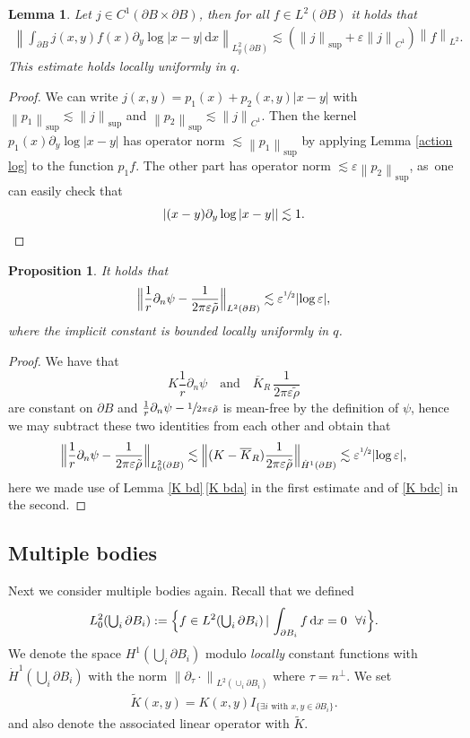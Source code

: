 \documentclass[JEP,XML,SOM,Unicode,published]{cedram}
\let\epsilon\varepsilon
\let\ts\textstyle
\newtheorem{proposition}[theorem]{Proposition}
\newtheorem{lemma}[theorem]{Lemma}
\theoremstyle{definition}
\newcommand\norm[1]{\left\lVert #1\right\rVert}
\newcommand\Bnorm[1]{\Bigl\lVert #1\Bigr\rVert}
\newcommand\eq{=}
\newcommand\dd{\,\mathrm{d}}
\newcommand\dx{\dd x}
\let\de\partial
\let\eps\epsilon
\begin{document}
\begin{lemma}\label{perturbed log}
Let $j\in C^1(\de B\times \de B)$, then for all $f\in L^2(\de B)$ it holds that
\begin{align*}
\norm{\int_{\de B} j(x,y)f(x)\de_y\log|x-y|\dx}_{L_y^2(\de B)}\lesssim \left(\norm{j}_{\sup}+\eps\norm{j}_{C^1}\right)\norm{f}_{L^2}.
\end{align*}
This estimate holds locally uniformly in $q$.
\end{lemma}
\begin{proof}
We can write $j(x,y)=p_1(x)+p_2(x,y)|x-y|$ with $\norm{p_1}_{\sup}\lesssim \norm{j}_{\sup}$ and $\norm{p_2}_{\sup}\lesssim \norm{j}_{C^1}$. Then the kernel $p_1(x)\de_y\log|x-y|$ has operator norm $\lesssim \norm{p_1}_{\sup}$ by applying Lemma \ref{action log} to the function $p_1f$. The other part has operator norm $\lesssim \eps\norm{p_2}_{\sup}$, as~one can easily check that
\[
|(x-y)\de_y\log|x-y||\lesssim 1.\qedhere
\]
\end{proof}

\begin{proposition}\label{est single body}
It holds that
\begin{align*}
\Bnorm{\frac{1}{r}\de_n\psi-\frac{1}{2\pi \eps\tilde{\rho}}}_{L^2(\de B)}\lesssim \eps^{\sfrac{1}{2}}|{\log\eps}|,
\end{align*}
where the implicit constant is bounded locally uniformly in $q$.
\end{proposition}

\begin{proof}
We have that 
\[
K\frac{1}{r}\de_n\psi\quad\text{and}\quad\overline K_R\,\frac{1}{2\pi\eps\tilde{\rho}}
\]
are constant on $\de B$ and $\frac{1}{r}\de_n\psi-\sfrac{1}{2\pi \eps\tilde{\rho}}$ is mean-free by the definition of $\psi$, hence we may subtract these two identities from each other and obtain that
\begin{align*}
\Bnorm{\frac{1}{r}\de_n\psi-\frac{1}{2\pi \eps\tilde{\rho}}}_{L_0^2(\de B)}\lesssim \Bnorm{(K-\overline{K}_R)\frac{1}{2\pi \eps\tilde{\rho}}}_{\dot{H}^1(\de B)}\lesssim \eps^{\sfrac{1}{2}}|{\log\eps}|,
\end{align*}
here we made use of Lemma \ref{K bd}\,\eqref{K bda} in the first estimate and of \eqref{K bdc} in the second.
\end{proof}

\subsection{Multiple bodies}
Next we consider multiple bodies again. Recall that we defined
\[
L_0^2({\ts\bigcup_i \de B_i}):=\Bigl\{f\in L^2({\ts\bigcup_i\de B_i})\,|\,\int_{\de B_i} f\dx\eq 0\:\:\:\forall i\Bigr\}.
\]
We denote the space $H^1(\bigcup_i \de B_i)$ modulo \emph{locally} constant functions with $\dot{H}^1(\bigcup_i\de B_i)$ with the norm $\norm{\de_\tau\cdot}_{L^2(\cup_i\de B_i)}$ where $\tau=n^\perp$.
We set
\begin{align*}
\tilde{K}(x,y)\eq K(x,y)I_{\{\exists i\text{ with } x,y\in \de B_i\}}.
\end{align*}
and also denote the associated linear operator with $\tilde{K}$.
\end{document}
